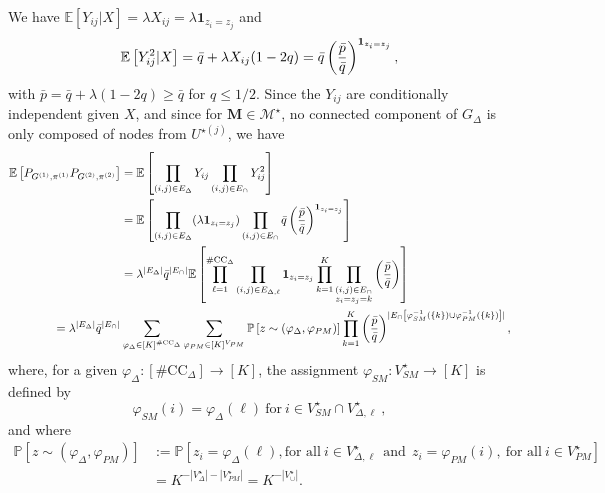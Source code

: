 \documentclass[final]{colt2026}
\newcommand{\1}{\mathbf{1}}
\newcommand{\nico}[1]{\textcolor{red}{[Nicolas: #1]}}
\newcommand{\bbE}{\mathbb{E}}
\newcommand{\bbP}{\mathbb{P}}
\newcommand{\pa}[1]{\left(#1\right)}
\newcommand{\ac}[1]{\left\{#1\right\}}
\newcommand{\cro}[1]{\left[#1\right]}
\begin{document}
We have $\bbE\cro{Y_{ij}|X}=\lambda X_{ij}=\lambda  \mathbf{1}_{z_{i}=z_{j}}$ and 
$$\bbE\cro{Y_{ij}^2|X}= \bar q+ \lambda X_{ij}(1-2q)=\bar q \pa{\bar p\over \bar q}^{ \mathbf{1}_{z_{i}=z_{j}}},$$ with $\bar p=\bar q+\lambda (1-2q)\geq \bar q$ for $q\leq 1/2$.
Since the $Y_{ij}$ are conditionally independent given $X$, and since for $\mathbf{M}\in\mathcal{M}^\star$, no connected component of $G_{\Delta}$ is only composed of nodes from $U^{\star(j)}$, we have
\begin{align}\nonumber
   \bbE\cro{P_{G^{(1)}, \pi^{(1)}}P_{G^{(2)}, \pi^{(2)}}} 
    & = \bbE\cro{\prod_{(i,j)\in E_{\Delta}}Y_{ij}\prod_{(i,j)\in E_{\cap}}Y_{ij}^2}  \\ \label{eq:proof:ingredient:basis}
    &=   \bbE\cro{\prod_{(i,j)\in E_{\Delta}} (\lambda \mathbf{1}_{z_{i}=z_{j}}) \prod_{(i,j)\in E_{\cap}}\bar q \pa{\bar p\over \bar q}^{ \mathbf{1}_{z_{i}=z_{j}}}}\\ \nonumber
    &= \lambda^{|E_{\Delta}|} \bar q^{|E_{\cap}|} \bbE\cro{\prod_{\ell=1}^{\#\mathrm{CC}_{\Delta}}\prod_{(i,j)\in E_{\Delta,\ell}} \mathbf{1}_{z_{i}=z_{j}} \prod_{k=1}^K\prod_{\substack{(i,j)\in E_{\cap}\\ \nonumber z_{i}=z_{j}=k}}\pa{\bar p\over \bar q}}\\ \nonumber
    = \lambda^{|E_{\Delta}|} \bar q^{|E_{\cap}|}& \sum_{\varphi_{\Delta}\in [K]^{\#\mathrm{CC}_{\Delta}}} \sum_{\varphi_{PM}\in [K]^{V_{PM}}}\bbP\cro{z\sim(\varphi_{\Delta},\varphi_{PM})} \prod_{k=1}^K \pa{\bar p\over \bar q}^{|E_{\cap}\cro{\varphi_{SM}^{-1}(\ac{k})\cup\varphi_{PM}^{-1}(\ac{k})}|},
    \end{align}
where, for a given $\varphi_{\Delta}:\cro{\#\mathrm{CC}_{\Delta}}\to [K]$, the assignment $\varphi_{SM}:V^{\star}_{SM}\to [K]$ is defined by 
\begin{equation}\label{eq:phi-SM}
\varphi_{SM}(i)=\varphi_{\Delta}(\ell)\ \text{for}\ i\in V^{\star}_{SM}\cap V^{\star}_{\Delta,\ell}\ ,
\end{equation}
 and  where
\begin{align*}
\bbP\cro{z\sim(\varphi_{\Delta},\varphi_{PM})} & := \bbP\cro{z_{i}=\varphi_{\Delta}(\ell), \text{for all}\ i\in V^{\star}_{\Delta,\ell}\ \ \text{and}\ \ z_{i}=\varphi_{PM}(i),\ \text{for all}\ i\in V^{\star}_{PM}}\\
& = K^{-|V^{\star}_{\Delta}|-|V^{\star}_{PM}|} = K^{-|V^{\star}_{\cup}|}.
\end{align*}
\end{document}
